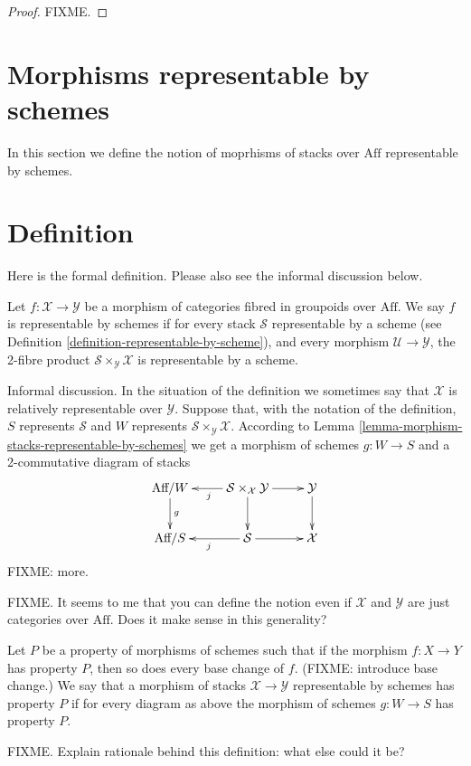 \begin{proof}
FIXME.
\end{proof}

\section{Morphisms representable by schemes}
\label{section-morphisms-representable-by-schemes}

\noindent
In this section we define the notion of moprhisms of stacks over $\text{Aff}$
representable by schemes.

\section{Definition}
\label{section-definition-representable-by-schemes}

\noindent
Here is the formal definition. Please also see the informal discussion below.

\begin{definition}
\label{definition-representable-by-schemes}
Let $f : \mathcal{X} \to \mathcal{Y}$ be a morphism of categories
fibred in groupoids over $\text{Aff}$. We say $f$ is representable by
schemes if for every stack $\mathcal{S}$ representable by a scheme
(see Definition \ref{definition-representable-by-scheme}), and every morphism
$\mathcal{U} \to \mathcal{Y}$, the 2-fibre product
$\mathcal{S}\times_\mathcal{Y}\mathcal{X}$ is representable by a scheme.
\end{definition}

\noindent
Informal discussion. In the situation of the definition we sometimes 
say that $\mathcal{X}$ is relatively representable over $\mathcal{Y}$.
Suppose that, with the notation of the definition, $S$ represents
$\mathcal{S}$ and $W$ represents $\mathcal{S}\times_\mathcal{Y}\mathcal{X}$.
According to Lemma \ref{lemma-morphism-stacks-representable-by-schemes}
we get a morphism of schemes $g : W \to S$ and a 2-commutative diagram
of stacks
$$
\xymatrix{
\text{Aff}/W \ar[d]^g &
\mathcal{S}\times_\mathcal{X}\mathcal{Y} \ar[d] \ar[l]^j \ar[r] &
\mathcal{Y} \ar[d] \\
\text{Aff}/S &
\mathcal{S} \ar[l]^j \ar[r] & \mathcal{X}
}
$$
FIXME: more.

\medskip\noindent
FIXME. It seems to me that you can define the notion even if 
$\mathcal{X}$ and $\mathcal{Y}$ are just categories over $\text{Aff}$. Does
it make sense in this generality?

\begin{definition}
\label{definition-property-morphism-representable-by-schemes}
Let $P$ be a property of morphisms of schemes such that
if the morphism $f : X \to Y$ has property $P$, then so does
every base change of $f$. (FIXME: introduce base change.)
We say that a morphism of stacks $\mathcal{X}
\to \mathcal{Y}$ representable by schemes has property
$P$ if for every diagram as above the morphism of schemes
$g : W \to S$ has property $P$.
\end{definition}

\noindent
FIXME. Explain rationale behind this definition: what else could it be?







